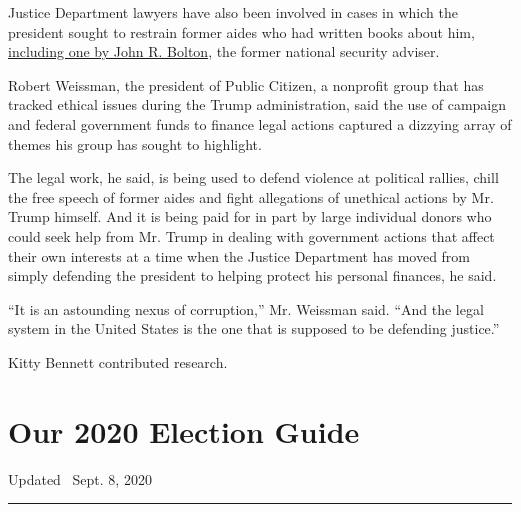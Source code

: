 Justice Department lawyers have also been involved in cases in which the
president sought to restrain former aides who had written books about
him,
\href{https://int.graylady3jvrrxbe.onion/data/documenthelper/7030-john-bolton-lawsuit/ce3b8c4bf5f6687fa454/optimized/full.pdf\#page=1}{including
one by John R. Bolton}, the former national security adviser.

Robert Weissman, the president of Public Citizen, a nonprofit group that
has tracked ethical issues during the Trump administration, said the use
of campaign and federal government funds to finance legal actions
captured a dizzying array of themes his group has sought to highlight.

The legal work, he said, is being used to defend violence at political
rallies, chill the free speech of former aides and fight allegations of
unethical actions by Mr. Trump himself. And it is being paid for in part
by large individual donors who could seek help from Mr. Trump in dealing
with government actions that affect their own interests at a time when
the Justice Department has moved from simply defending the president to
helping protect his personal finances, he said.

``It is an astounding nexus of corruption,'' Mr. Weissman said. ``And
the legal system in the United States is the one that is supposed to be
defending justice.''

Kitty Bennett contributed research.

\hypertarget{our-2020-election-guide}{%
\section{Our 2020 Election Guide}\label{our-2020-election-guide}}

Updated ~Sept. 8, 2020

\begin{center}\rule{0.5\linewidth}{\linethickness}\end{center}

